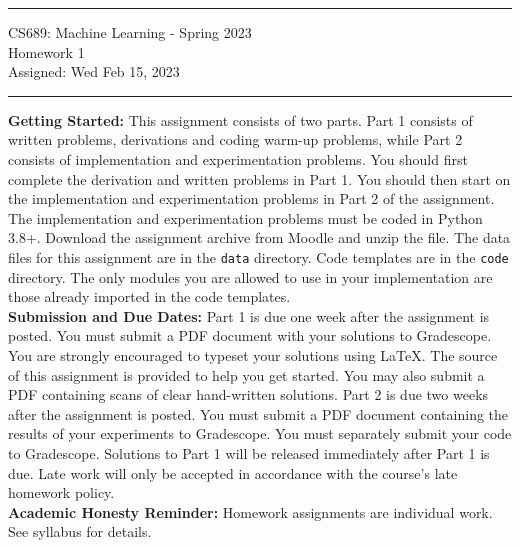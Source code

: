 \documentclass[11pt]{article}
\begin{document}
{\centering
  \rule{6.3in}{2pt}
  \vspace{1em}
  {\Large
    CS689: Machine Learning - Spring 2023\\
    Homework 1\\
  }
  \vspace{1em}
  Assigned: Wed Feb 15, 2023 \\
  \vspace{0.1em}
  \rule{6.3in}{1.5pt}
}
\vspace{1pc}

\textbf{Getting Started:} This assignment consists of two parts. Part 1 consists of written problems, derivations and coding warm-up problems, while Part 2 consists of implementation and experimentation problems. You should first complete the derivation and written problems in Part 1. You should then start on the implementation and experimentation problems in Part 2 of the assignment. The implementation and experimentation problems must be coded in Python 3.8+. Download the assignment archive from Moodle and unzip the file. The data files for this assignment are in the \verb|data| directory. Code templates are in the \verb|code| directory. The only modules you are allowed to use in your implementation are those already imported in the code templates.\\

\textbf{Submission and Due Dates:} Part 1 is due one week after the assignment is posted. You must submit a PDF document with your solutions to Gradescope. You are strongly encouraged to typeset your solutions using LaTeX. The source of this assignment is provided to help you get started. You may also submit a PDF containing scans of clear hand-written solutions. Part 2 is due two weeks after the assignment is posted. You must submit a PDF document containing the results of your experiments to Gradescope. You must separately submit your code to Gradescope. Solutions to Part 1 will be released immediately after Part 1 is due. Late work will only be accepted in accordance with the course's late homework policy.\\

\textbf{Academic Honesty Reminder:} Homework assignments are individual work. See syllabus for details.
\\
\end{document}
